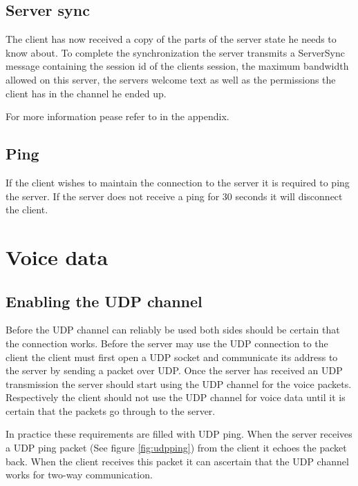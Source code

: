 \documentclass[11pt]{article} %
\begin{document}
\subsection {Server sync}
\label{sect:serverSync}

The client has now received a copy of the parts of the server state he needs to know about. To complete the synchronization the server transmits a ServerSync message containing the session id of the clients session, the maximum bandwidth allowed on this server, the servers welcome text as well as the permissions the client has in the channel he ended up.

For more information pease refer to  in the appendix.

\subsection {Ping}

If the client wishes to maintain the connection to the server it is required to ping the server. If the server does not receive a ping for 30 seconds it will disconnect the client.

\section {Voice data}

\subsection{Enabling the UDP channel}
\label{sect:udpping}

Before the UDP channel can reliably be used both sides should be certain that the connection works. Before the server may use the UDP connection to the client the client must first open a UDP socket and communicate its address to the server by sending a packet over UDP. Once the server has received an UDP transmission the server should start using the UDP channel for the voice packets. Respectively the client should not use the UDP channel for voice data until it is certain that the packets go through to the server.

In practice these requirements are filled with UDP ping. When the server receives a UDP ping packet (See figure \ref{fig:udpping}) from the client it echoes the packet back. When the client receives this packet it can ascertain that the UDP channel works for two-way communication.
\end{document}
